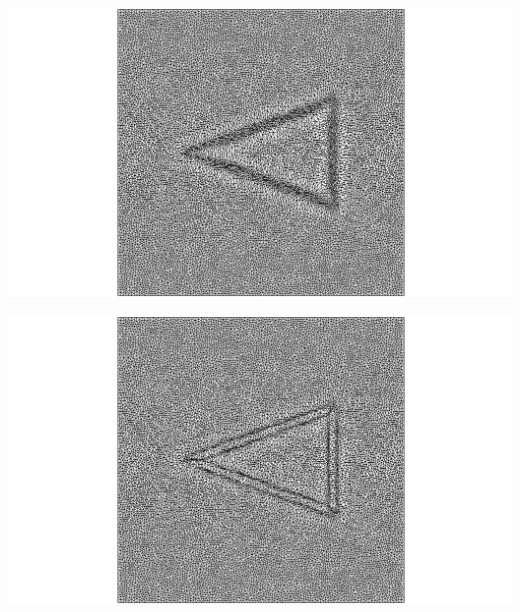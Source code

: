 \begingroup
	\begin{minipage}[t]{.5\linewidth}
		\centering
		\includegraphics[clip=true, trim = 10cm 0 10cm 0, scale=.25]{Bordeaux/figures/alphabeta0.png}
	\end{minipage}
	\hfill
	\begin{minipage}[t]{.5\linewidth}
		\centering
		\includegraphics[clip=true, trim = 10cm 0 10cm 0, scale=.25]{Bordeaux/figures/alphabeta1.png}
	\end{minipage}
\endgroup

